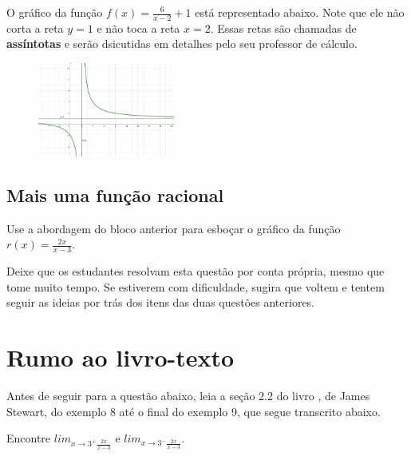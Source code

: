 \documentclass[main.tex]{subfiles}
\begin{document}
O gráfico da função $f(x)=\frac{6}{x-2}+1$ está representado abaixo. Note que ele não corta a reta $y=1$ e não toca a reta $x=2$. Essas retas são chamadas de \textbf{assíntotas} e serão dsicutidas em detalhes pelo seu professor de cálculo.

\begin{figure}[h]
\centering
\includegraphics[width=0.4\textwidth]{img/c3q12.png}
\end{figure}

\subsection*{Mais uma função racional}

\begin{questao}
Use a abordagem do bloco anterior para esboçar o gráfico da função $r(x)=\frac{2x}{x-3}$.
\end{questao}
\newpage

\paraTutores

Deixe que os estudantes resolvam esta questão por conta própria, mesmo que tome muito tempo. Se estiverem com dificuldade, sugira que voltem e tentem seguir as ideias por trás dos itens das duas questões anteriores.

\paraAmbos

\section{Rumo ao livro-texto}

Antes de seguir para a questão abaixo, leia a seção 2.2 do livro , de James Stewart, do exemplo 8 até o final do exemplo 9, que segue transcrito abaixo.

\begin{resolvida}
Encontre $lim_{x\rightarrow3^+ \frac{2x}{x-3}}$ e $lim_{x\rightarrow3^- \frac{2x}{x-3}}$.
\end{resolvida}

\paraTutores
\end{document}
